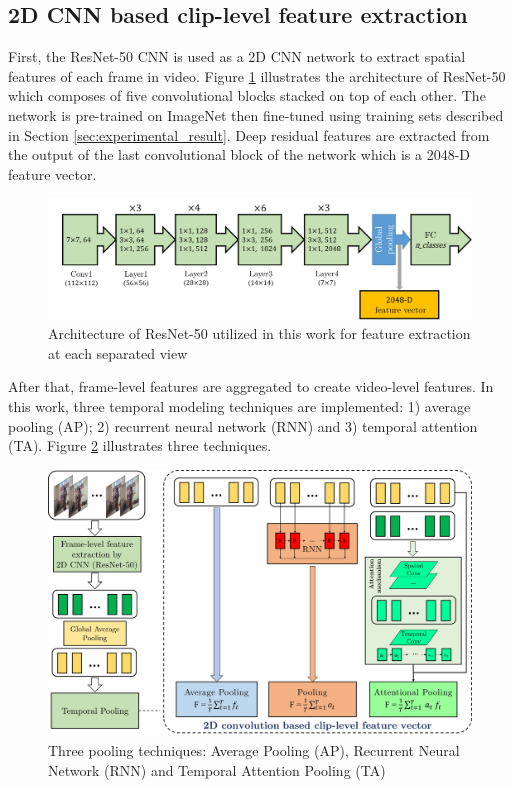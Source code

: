 
\subsection{2D CNN based clip-level feature extraction}
    First, the ResNet-50 CNN \cite{he2016deep} is used as a 2D CNN network to extract spatial features of each frame in video.
    Figure \ref{fig:resnet50} illustrates the architecture of ResNet-50 which composes of five convolutional blocks stacked on top of each other. The network is pre-trained on ImageNet then fine-tuned using training sets described in Section \ref{sec:experimental_result}.
    Deep residual features are extracted from the output of the last convolutional block of the network which is a 2048-D feature vector.
    \begin{figure}[htbp]
        \centering
        \includegraphics[width=1\linewidth]{Figs/Resnet50.png}
        \caption{Architecture of ResNet-50 utilized in this work for feature extraction at each separated view}
        \label{fig:resnet50}
    \end{figure}
    After that, frame-level features are aggregated to create video-level features.
    In this work, three temporal modeling techniques are implemented: 1) average pooling (AP); 2) recurrent neural network (RNN) and 3) temporal attention (TA).
    Figure \ref{fig:pooling} illustrates three techniques.
    \begin{figure}[htbp]
        \centering
        \includegraphics[width=1\linewidth]{Figs/Pooling.png}
        \caption{Three pooling techniques: Average Pooling (AP), Recurrent Neural Network (RNN) and Temporal Attention Pooling (TA)}
        \label{fig:pooling}
    \end{figure}

